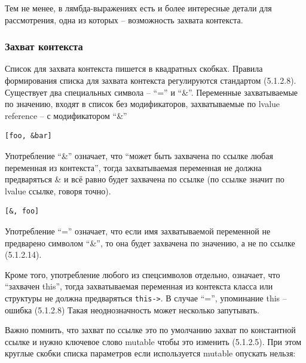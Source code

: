 \documentclass[a4paper,12pt,oneside]{article}
\begin{document}
Тем не менее, в лямбда-выражениях есть и более интересные детали для рассмотрения, одна из которых -- возможность захвата контекста.

\subsubsection{Захват контекста}

Список для захвата контекста пишется в квадратных скобках. Правила формирования списка для захвата контекста регулируются стандартом (5.1.2.8). Существует два специальных символа -- ``='' и ``\&''. Переменные захватываемые по значению, входят в список без модификаторов, захватываемые по lvalue reference -- с модификатором ``\&''

\begin{lstlisting}
[foo, &bar]
\end{lstlisting}

Употребление ``\&'' означает, что ``может быть захвачена по ссылке любая переменная из контекста'', тогда захватываемая переменная не должна предваряться \& и всё равно будет захвачена по ссылке (по ссылке значит по lvalue ссылке, говоря точно).

\begin{lstlisting}
[&, foo]
\end{lstlisting}

Употребление ``='' означает, что если имя захватываемой переменной не предварено символом ``\&'', то она будет захвачена по значению, а не по ссылке (5.1.2.14). 

Кроме того, употребление любого из спецсимволов отдельно, означает, что ``захвачен this'', тогда захватываемая переменная из контекста класса или структуры не должна предваряться \lstinline!this->!. В случае ``='', упоминание this -- ошибка (5.1.2.8)  Такая неоднозначность может несколько запутывать.

Важно помнить, что захват по ссылке это по умолчанию захват по константной ссылке и нужно ключевое слово mutable чтобы это изменить (5.1.2.5). При этом круглые скобки списка параметров если используется mutable опускать нельзя:
\end{document}
